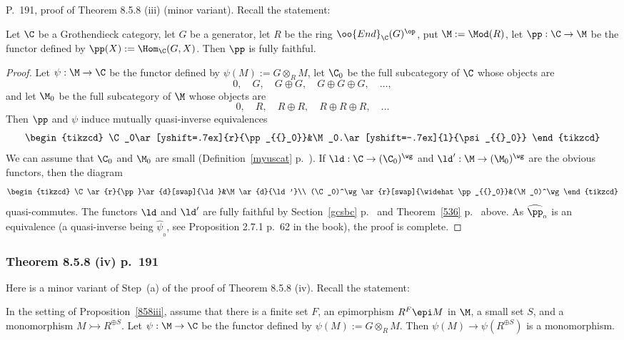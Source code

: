\documentclass[12pt]{article}
\theoremstyle{remark}
\theoremstyle{definition}
\begin{document}
\begin{s} P.~191, proof of Theorem 8.5.8 (iii) (minor variant). Recall the statement: 

\begin{prop}
Let $\C$ be a Grothendieck category, let $G$ be a generator, let $R$ be the ring $\oo{End}_\C(G)^{\op}$, put $\M:=\Mod(R)$, let $\pp:\C\to\M$ be the functor defined by $\pp(X):=\Hom_\C(G,X)$. Then $\pp$ is fully faithful. 
\end{prop}

\begin{proof}
Let $\psi:\M\to\C$ be the functor defined by $\psi(M):=G\otimes_RM$, let $\C_0$ be the full subcategory of $\C$ whose objects are 
$$
0,\quad G,\quad G\oplus G,\quad G\oplus G\oplus G,\quad\dots,
$$
and let $\M_0$ be the full subcategory of $\M$ whose objects are 
$$
0,\quad R,\quad R\oplus R,\quad R\oplus R\oplus R,\quad\dots
$$
Then $\pp$ and $\psi$ induce mutually quasi-inverse equivalences 
$$
\begin{tikzcd}
\C_0\ar[yshift=.7ex]{r}{\pp_{{}_0}}&\M_0.\ar[yshift=-.7ex]{l}{\psi_{{}_0}}
\end{tikzcd}
$$ 
We can assume that $\C_0$ and $\M_0$ are small (Definition~\ref{myuscat} p.~). If $\ld:\C\to(\C_0)^\wg$ and $\ld':\M\to(\M_0)^\wg$ are the obvious functors, then the diagram 
$$
\begin{tikzcd}
\C\ar{r}{\pp}\ar{d}[swap]{\ld}&\M\ar{d}{\ld'}\\
(\C_0)^\wg\ar{r}[swap]{\widehat\pp_{{}_0}}&(\M_0)^\wg
\end{tikzcd}
$$ 
quasi-commutes. The functors $\ld$ and $\ld'$ are fully faithful by Section~\ref{gcsbc} p.~ and Theorem~\ref{536} p.~ above. As $\widehat\pp_{{}_0}$ is an equivalence (a quasi-inverse being $\widehat\psi_{{}_0}$, see Proposition 2.7.1 p.~62 in the book), the proof is complete.
\end{proof}
\end{s}


\subsubsection{Theorem 8.5.8 (iv) p.~191} 

Here is a minor variant of Step~(a) of the proof of Theorem 8.5.8 (iv). Recall the statement: 

\begin{lem}
In the setting of Proposition~\ref{858iii}, assume that there is a finite set $F$, an epimorphism $R^F\epi M$ in $\M$, a small set $S$, and a monomorphism $M\rightarrowtail R^{\oplus S}$. Let $\psi:\M\to\C$ be the functor defined by $\psi(M):=G\otimes_RM$. Then $\psi(M)\to\psi(R^{\oplus S})$ is a monomorphism. 
\end{lem}
\end{document}
